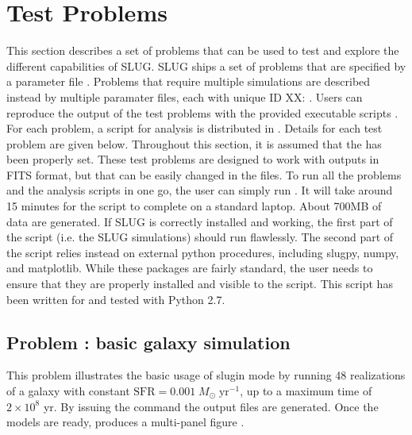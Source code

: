 \documentclass[letterpaper,10pt,english]{sphinxmanual}
\begin{document}
\chapter{Test Problems}
\label{\detokenize{tests:test-problems}}\label{\detokenize{tests:sec-tests}}\label{\detokenize{tests::doc}}
This section describes a set of problems that can be used to test and explore the different capabilities of SLUG. SLUG ships a
set of problems  that are specified by a parameter file . Problems that require
multiple simulations are described instead by multiple paramater files, each with unique ID XX:  .
Users can reproduce the output of the test problems with the provided executable scripts  .
For each problem, a script for analysis is distributed  in . Details for each test problem are given below. Throughout this section, it is assumed that the  has been properly set.
These test problems are designed to work with outputs in FITS format, but that can be easily changed in the
 files. To run all the problems and the analysis scripts in one go, the user can simply
run . It will take around 15 minutes
for the script to complete on a standard laptop. About 700MB of data are generated.
If SLUG is correctly installed and working, the first part of the script (i.e. the SLUG
simulations) should run flawlessly. The second part of the script relies instead on external python procedures,
including slugpy, numpy, and matplotlib. While these packages are fairly standard, the user needs to ensure that
they are properly installed and visible to the script. This script has been written for and tested with Python 2.7.


\section{Problem : basic galaxy simulation}
\label{\detokenize{tests:problem-example-galaxy-basic-galaxy-simulation}}
This problem illustrates the basic usage of slugin  mode by running 48 realizations of a galaxy with constant
\(\mathrm{SFR}=0.001\; M_\odot\;\mathrm{yr}^{-1}\), up to a maximum time of \(2\times 10^8\) yr. By issuing the
command  the output files  are generated. Once the models are ready,
 produces a multi-panel figure .
\end{document}
